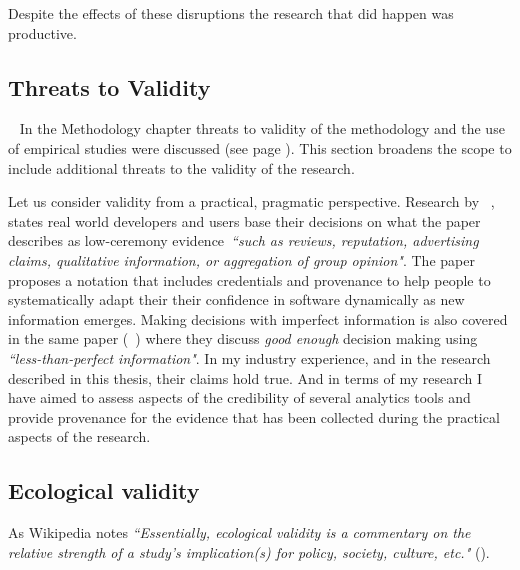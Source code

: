 \afterpage{\clearpage}
Despite the effects of these disruptions the research that did happen was productive. 






\subsection{Threats to Validity}~\label{discussion-threats-to-validity-section}
In the Methodology chapter threats to validity of the methodology and the use of empirical studies were discussed (see page \pageref{methodology-threats-to-validity-section}). This section broadens the scope to include additional threats to the validity of the research.

Let us consider validity from a practical, pragmatic perspective. 
Research by ~, states real world developers and users base their decisions on what the paper describes as low-ceremony evidence~\emph{``such as reviews, reputation, advertising claims, qualitative information, or aggregation of group opinion"}. The paper proposes a notation that includes credentials and provenance to help people to systematically adapt their their confidence in software dynamically as new information emerges. Making decisions with imperfect information is also covered in the same paper (~) where they discuss \emph{good enough} decision making using \emph{``less-than-perfect information"}. In my industry experience, and in the research described in this thesis, their claims hold true. And in terms of my research I have aimed to assess aspects of the credibility of several analytics tools and provide provenance for the evidence that has been collected during the practical aspects of the research.





\subsection{Ecological validity}
As Wikipedia notes \emph{``Essentially, ecological validity is a commentary on the relative strength of a study's implication(s) for policy, society, culture, etc."} ().

